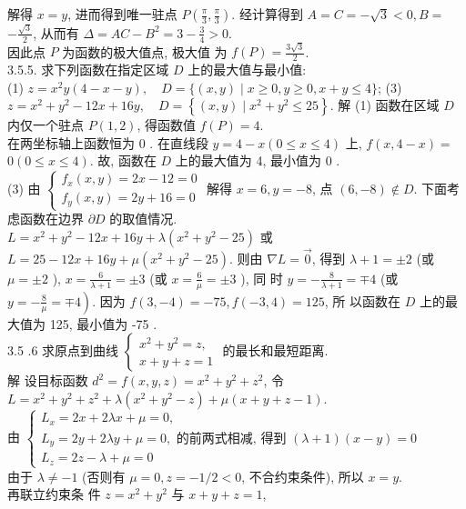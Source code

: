 \documentclass[a4paper,11pt,UTF8]{article}
\begin{document}
解得 $x=y$, 进而得到唯一驻点 $P\left(\frac{\pi}{3}, \frac{\pi}{3}\right)$. 经计算得到 $A=C=-\sqrt{3}<0, B=$ $-\frac{\sqrt{3}}{2}$, 从而有 $\Delta=A C-B^2=3-\frac{3}{4}>0$.\\
 因此点 $P$ 为函数的极大值点, 极大值 为 $f(P)=\frac{3 \sqrt{3}}{2}$.\\
3.5.5. 求下列函数在指定区域 $D$ 上的最大值与最小值:\\
(1) $z=x^2 y(4-x-y), \quad D=\{(x, y) \mid x \geq 0, y \geq 0, x+y \leq 4\}$;
(3) $z=x^2+y^2-12 x+16 y, \quad D=\left\{(x, y) \mid x^2+y^2 \leq 25\right\}$.
解 (1) 函数在区域 $D$ 内仅一个驻点 $P(1,2)$, 得函数值 $f(P)=4$.\\
在两坐标轴上函数恒为 0 . 在直线段 $y=4-x(0 \leq x \leq 4)$ 上, $f(x, 4-x)=$ $0(0 \leq x \leq 4)$. 故, 函数在 $D$ 上的最大值为 4, 最小值为 0 .\\
(3) 由 $\left\{\begin{array}{l}f_x(x, y)=2 x-12=0 \\ f_y(x, y)=2 y+16=0\end{array}\right.$ 解得 $x=6, y=-8$, 点 $(6,-8) \notin D$. 下面考 虑函数在边界 $\partial D$ 的取值情况.\\
$L=x^2+y^2-12 x+16 y+\lambda\left(x^2+y^2-25\right)$ 或 $L=25-12 x+16 y+\mu\left(x^2+y^2-25\right)$. 则由 $\nabla L=\overrightarrow{0}$, 得到 $\lambda+1= \pm 2$ (或 $\mu= \pm 2$ ), $x=\frac{6}{\lambda+1}= \pm 3$ (或 $x=\frac{6}{\mu}= \pm 3$ ), 同 时 $y=-\frac{8}{\lambda+1}=\mp 4$ (或 $\left.y=-\frac{8}{\mu}=\mp 4\right)$. 因为 $f(3,-4)=-75, f(-3,4)=125$, 所 以函数在 $D$ 上的最大值为 125, 最小值为 -75 .\\
3.5 .6 求原点到曲线 $\left\{\begin{array}{l}x^2+y^2=z, \\ x+y+z=1\end{array}\right.$ 的最长和最短距离.\\
解 设目标函数 $d^2=f(x, y, z)=x^2+y^2+z^2$, 令
$L=x^2+y^2+z^2+\lambda\left(x^2+y^2-z\right)+\mu(x+y+z-1)$. \\
由 $\left\{\begin{array}{l}L_x=2 x+2 \lambda x+\mu=0, 
	\\ L_y=2 y+2 \lambda y+\mu=0, \text { 的前两式相减, 得到 }(\lambda+1)(x-y)=0 
	\\ L_z=2 z-\lambda+\mu=0\end{array}\right.$\\
$ \text {由于 } \lambda \neq-1$ (否则有 $\mu=0, z=-1 / 2<0$, 不合约束条件), 所以 $x=y$.\\
 再联立约束条 件 $z=x^2+y^2$ 与 $x+y+z=1$,\\
\end{document}
